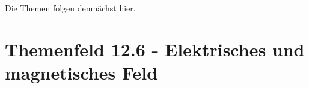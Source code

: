 \documentclass[a4paper, 10pt]{scrartcl}
\begin{document}
Die Themen folgen demnächst hier.






%
%

\part{Themenfeld 12.6 - Elektrisches und magnetisches Feld}
\label{Teil_12_6}
\begin{frame}
  \partpage
\end{frame}
\end{document}
